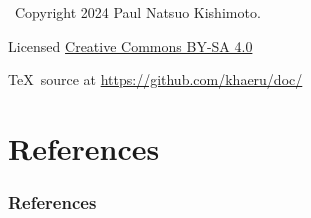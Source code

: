 \documentclass[12pt,aspectratio=169]{beamer}
\begin{document}
\begin{frame}[c,plain]
  \vfill
  {\centering \Huge {}}

  \vfill
  \textcopyright\ Copyright 2024 Paul Natsuo Kishimoto.

  Licensed \href{https://creativecommons.org/licenses/by-sa/4.0/}{Creative Commons BY-SA 4.0}

  \TeX\ source at \url{https://github.com/khaeru/doc/}
\end{frame}

\appendix

\section{References}

\begin{frame}
\frametitle{References}

\printbibliography[heading=none]

\end{frame}
\end{document}
